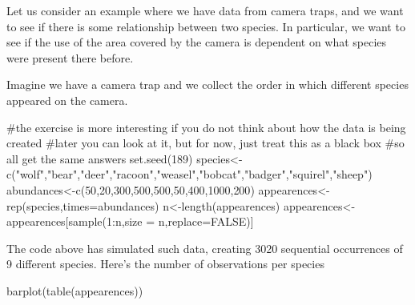 \documentclass[
  letterpaper,
  DIV=11,
  numbers=noendperiod]{scrartcl}
\newenvironment{Shaded}{\begin{snugshade}}{\end{snugshade}}
\newcommand{\AttributeTok}[1]{\textcolor[rgb]{0.40,0.45,0.13}{#1}}
\newcommand{\CommentTok}[1]{\textcolor[rgb]{0.37,0.37,0.37}{#1}}
\newcommand{\ConstantTok}[1]{\textcolor[rgb]{0.56,0.35,0.01}{#1}}
\newcommand{\DecValTok}[1]{\textcolor[rgb]{0.68,0.00,0.00}{#1}}
\newcommand{\FunctionTok}[1]{\textcolor[rgb]{0.28,0.35,0.67}{#1}}
\newcommand{\NormalTok}[1]{\textcolor[rgb]{0.00,0.23,0.31}{#1}}
\newcommand{\OtherTok}[1]{\textcolor[rgb]{0.00,0.23,0.31}{#1}}
\newcommand{\SpecialCharTok}[1]{\textcolor[rgb]{0.37,0.37,0.37}{#1}}
\newcommand{\StringTok}[1]{\textcolor[rgb]{0.13,0.47,0.30}{#1}}
\begin{document}
Let us consider an example where we have data from camera traps, and we
want to see if there is some relationship between two species. In
particular, we want to see if the use of the area covered by the camera
is dependent on what species were present there before.

Imagine we have a camera trap and we collect the order in which
different species appeared on the camera.

\begin{Shaded}
\begin{Highlighting}[]
\CommentTok{\#the exercise is more interesting if you do not think about how the data is being created}
\CommentTok{\#later you can look at it, but for now, just treat this as a black box}
\CommentTok{\#so all get the same answers}
\FunctionTok{set.seed}\NormalTok{(}\DecValTok{189}\NormalTok{)}
\NormalTok{species}\OtherTok{\textless{}{-}}\FunctionTok{c}\NormalTok{(}\StringTok{"wolf"}\NormalTok{,}\StringTok{"bear"}\NormalTok{,}\StringTok{"deer"}\NormalTok{,}\StringTok{"racoon"}\NormalTok{,}\StringTok{"weasel"}\NormalTok{,}\StringTok{"bobcat"}\NormalTok{,}\StringTok{"badger"}\NormalTok{,}\StringTok{"squirel"}\NormalTok{,}\StringTok{"sheep"}\NormalTok{)}
\NormalTok{abundances}\OtherTok{\textless{}{-}}\FunctionTok{c}\NormalTok{(}\DecValTok{50}\NormalTok{,}\DecValTok{20}\NormalTok{,}\DecValTok{300}\NormalTok{,}\DecValTok{500}\NormalTok{,}\DecValTok{500}\NormalTok{,}\DecValTok{50}\NormalTok{,}\DecValTok{400}\NormalTok{,}\DecValTok{1000}\NormalTok{,}\DecValTok{200}\NormalTok{)}
\NormalTok{appearences}\OtherTok{\textless{}{-}}\FunctionTok{rep}\NormalTok{(species,}\AttributeTok{times=}\NormalTok{abundances)}
\NormalTok{n}\OtherTok{\textless{}{-}}\FunctionTok{length}\NormalTok{(appearences)}
\NormalTok{appearences}\OtherTok{\textless{}{-}}\NormalTok{appearences[}\FunctionTok{sample}\NormalTok{(}\DecValTok{1}\SpecialCharTok{:}\NormalTok{n,}\AttributeTok{size =}\NormalTok{ n,}\AttributeTok{replace=}\ConstantTok{FALSE}\NormalTok{)]}
\end{Highlighting}
\end{Shaded}

The code above has simulated such data, creating 3020 sequential
occurrences of 9 different species. Here's the number of observations
per species

\begin{Shaded}
\begin{Highlighting}[]
\FunctionTok{barplot}\NormalTok{(}\FunctionTok{table}\NormalTok{(appearences))}
\end{Highlighting}
\end{Shaded}
\end{document}
